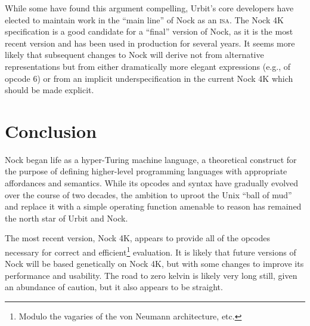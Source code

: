 \documentclass[twoside]{article}
\begin{document}
While some have found this argument compelling, Urbit's core developers have elected to maintain work in the ``main line'' of Nock as an \textsc{isa}.  The Nock 4K specification is a good candidate for a ``final'' version of Nock, as it is the most recent version and has been used in production for several years.  It seems more likely that subsequent changes to Nock will derive not from alternative representations but from either dramatically more elegant expressions (e.g., of opcode 6) or from an implicit underspecification in the current Nock 4K which should be made explicit.

\section{Conclusion}

Nock began life as a hyper-Turing machine language, a theoretical construct for the purpose of defining higher-level programming languages with appropriate affordances and semantics.  While its opcodes and syntax have gradually evolved over the course of two decades, the ambition to uproot the Unix ``ball of mud'' and replace it with a simple operating function amenable to reason has remained the north star of Urbit and Nock.

The most recent version, Nock 4K, appears to provide all of the opcodes necessary for correct and efficient\footnote{Modulo the vagaries of the von Neumann architecture, etc.} evaluation.  It is likely that future versions of Nock will be based genetically on Nock 4K, but with some changes to improve its performance and usability.  The road to zero kelvin is likely very long still, given an abundance of caution, but it also appears to be straight.

\printbibliography
\end{document}

